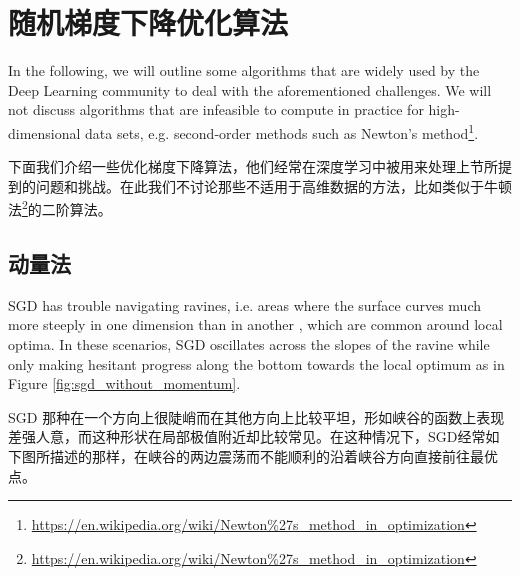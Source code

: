 \documentclass{article}
\begin{document}
\section{随机梯度下降优化算法} \label{sec:algos}

In the following, we will outline some algorithms that are widely used by the Deep Learning community to deal with the aforementioned challenges. We will not discuss algorithms that are infeasible to compute in practice for high-dimensional data sets, e.g. second-order methods such as Newton's method\footnote{\url{https://en.wikipedia.org/wiki/Newton\%27s_method_in_optimization}}.

下面我们介绍一些优化梯度下降算法，他们经常在深度学习中被用来处理上节所提到的问题和挑战。在此我们不讨论那些不适用于高维数据的方法，比如类似于牛顿法\footnote{\url{https://en.wikipedia.org/wiki/Newton\%27s_method_in_optimization}}的二阶算法。

\subsection{动量法}

SGD has trouble navigating ravines, i.e. areas where the surface curves much more steeply in one dimension than in another \cite{Sutton1986}, which are common around local optima. In these scenarios, SGD oscillates across the slopes of the ravine while only making hesitant progress along the bottom towards the local optimum as in Figure \ref{fig:sgd_without_momentum}.

SGD 那种在一个方向上很陡峭而在其他方向上比较平坦，形如峡谷的函数上表现差强人意\cite{Sutton1986}，而这种形状在局部极值附近却比较常见。在这种情况下，SGD经常如下图所描述的那样，在峡谷的两边震荡而不能顺利的沿着峡谷方向直接前往最优点。
\end{document}
